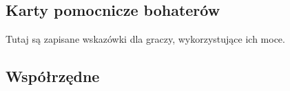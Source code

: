 	


	\subsection{Karty pomocnicze bohaterów}
		Tutaj są zapisane wskazówki dla graczy, wykorzystujące ich moce.

	\subsection{Współrzędne}
	\label{sec:wspolrzedne}
		\begin{multicols}{3}
		\end{multicols}

